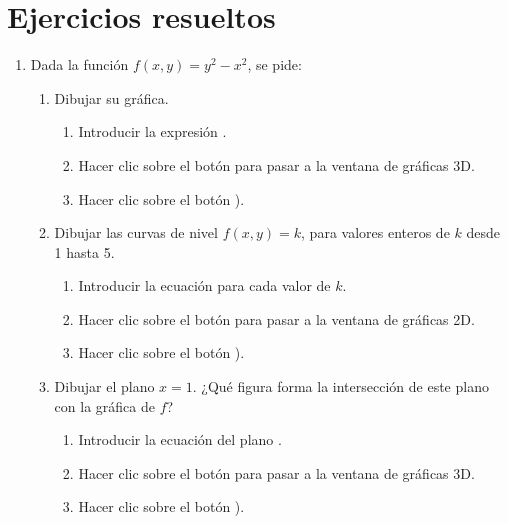 \section{Ejercicios resueltos}
\begin{enumerate}[leftmargin=*]
\item Dada la función $f(x,y)=y^2-x^2$, se pide:
\begin{enumerate}
\item Dibujar su gráfica. 
\begin{indicacion}
{\begin{enumerate}
\item Introducir la expresión .
\item Hacer clic sobre el botón  para pasar a la ventana de gráficas 3D.
\item Hacer clic sobre el botón ).
\end{enumerate}
}
\end{indicacion}

\item Dibujar las curvas de nivel $f(x,y)=k$, para valores enteros de $k$ desde 1 hasta 5.
\begin{indicacion}
{
\begin{enumerate}
\item Introducir la ecuación  para cada valor de $k$.
\item Hacer clic sobre el botón  para pasar a la ventana de gráficas 2D.
\item Hacer clic sobre el botón ).
\end{enumerate}
}
\end{indicacion}

\item Dibujar el plano $x=1$. ¿Qué figura forma la intersección de este plano con la gráfica de $f$?
\begin{indicacion}
{
\begin{enumerate}
\item Introducir la ecuación del plano .
\item Hacer clic sobre el botón  para pasar a la ventana de gráficas 3D.
\item Hacer clic sobre el botón ).
\end{enumerate}
}
\end{indicacion}


\end{enumerate}
\end{enumerate}
